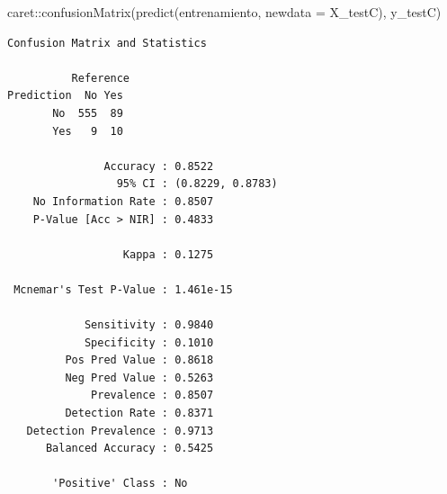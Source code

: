 \documentclass[
  letterpaper,
  DIV=11,
  numbers=noendperiod]{scrartcl}
\newenvironment{Shaded}{\begin{snugshade}}{\end{snugshade}}
\newcommand{\AttributeTok}[1]{\textcolor[rgb]{0.40,0.45,0.13}{#1}}
\newcommand{\FunctionTok}[1]{\textcolor[rgb]{0.28,0.35,0.67}{#1}}
\newcommand{\NormalTok}[1]{\textcolor[rgb]{0.00,0.23,0.31}{#1}}
\newcommand{\SpecialCharTok}[1]{\textcolor[rgb]{0.37,0.37,0.37}{#1}}
\begin{document}
\begin{Shaded}
\begin{Highlighting}[]
\NormalTok{caret}\SpecialCharTok{::}\FunctionTok{confusionMatrix}\NormalTok{(}\FunctionTok{predict}\NormalTok{(entrenamiento, }\AttributeTok{newdata =}\NormalTok{ X\_testC), y\_testC)}
\end{Highlighting}
\end{Shaded}

\begin{verbatim}
Confusion Matrix and Statistics

          Reference
Prediction  No Yes
       No  555  89
       Yes   9  10
                                          
               Accuracy : 0.8522          
                 95% CI : (0.8229, 0.8783)
    No Information Rate : 0.8507          
    P-Value [Acc > NIR] : 0.4833          
                                          
                  Kappa : 0.1275          
                                          
 Mcnemar's Test P-Value : 1.461e-15       
                                          
            Sensitivity : 0.9840          
            Specificity : 0.1010          
         Pos Pred Value : 0.8618          
         Neg Pred Value : 0.5263          
             Prevalence : 0.8507          
         Detection Rate : 0.8371          
   Detection Prevalence : 0.9713          
      Balanced Accuracy : 0.5425          
                                          
       'Positive' Class : No              
                                          
\end{verbatim}
\end{document}
